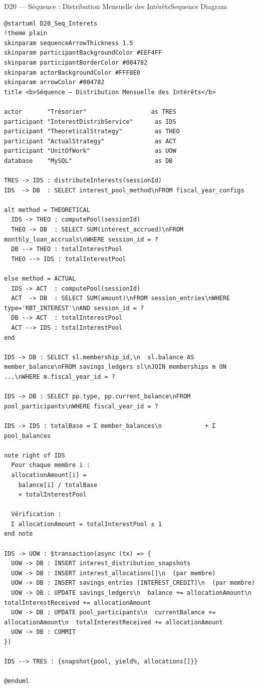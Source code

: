 \documentclass[12pt, a4paper]{report}
\begin{document}
\begin{diagramBox}{D20 — Séquence : Distribution Mensuelle des Intérêts}{Sequence Diagram}
\begin{lstlisting}
@startuml D20_Seq_Interets
!theme plain
skinparam sequenceArrowThickness 1.5
skinparam participantBackgroundColor #EEF4FF
skinparam participantBorderColor #004782
skinparam actorBackgroundColor #FFF8E0
skinparam arrowColor #004782
title <b>Séquence — Distribution Mensuelle des Intérêts</b>

actor       "Trésorier"                  as TRES
participant "InterestDistribService"      as IDS
participant "TheoreticalStrategy"         as THEO
participant "ActualStrategy"              as ACT
participant "UnitOfWork"                  as UOW
database    "MySQL"                       as DB

TRES -> IDS : distributeInterests(sessionId)
IDS  -> DB  : SELECT interest_pool_method\nFROM fiscal_year_configs

alt method = THEORETICAL
  IDS -> THEO : computePool(sessionId)
  THEO -> DB  : SELECT SUM(interest_accrued)\nFROM monthly_loan_accruals\nWHERE session_id = ?
  DB --> THEO : totalInterestPool
  THEO --> IDS : totalInterestPool

else method = ACTUAL
  IDS -> ACT  : computePool(sessionId)
  ACT  -> DB  : SELECT SUM(amount)\nFROM session_entries\nWHERE type='RBT_INTEREST'\nAND session_id = ?
  DB --> ACT  : totalInterestPool
  ACT --> IDS : totalInterestPool
end

IDS -> DB : SELECT sl.membership_id,\n  sl.balance AS member_balance\nFROM savings_ledgers sl\nJOIN memberships m ON ...\nWHERE m.fiscal_year_id = ?

IDS -> DB : SELECT pp.type, pp.current_balance\nFROM pool_participants\nWHERE fiscal_year_id = ?

IDS -> IDS : totalBase = Σ member_balances\n            + Σ pool_balances

note right of IDS
  Pour chaque membre i :
  allocationAmount[i] =
    balance[i] / totalBase
    × totalInterestPool

  Vérification :
  Σ allocationAmount = totalInterestPool ± 1
end note

IDS -> UOW : $transaction(async (tx) => {
  UOW -> DB : INSERT interest_distribution_snapshots
  UOW -> DB : INSERT interest_allocations[]\n  (par membre)
  UOW -> DB : INSERT savings_entries [INTEREST_CREDIT]\n  (par membre)
  UOW -> DB : UPDATE savings_ledgers\n  balance += allocationAmount\n  totalInterestReceived += allocationAmount
  UOW -> DB : UPDATE pool_participants\n  currentBalance += allocationAmount\n  totalInterestReceived += allocationAmount
  UOW -> DB : COMMIT
})

IDS --> TRES : {snapshot{pool, yield%, allocations[]}}

@enduml
\end{lstlisting}
\end{diagramBox}
\end{document}

